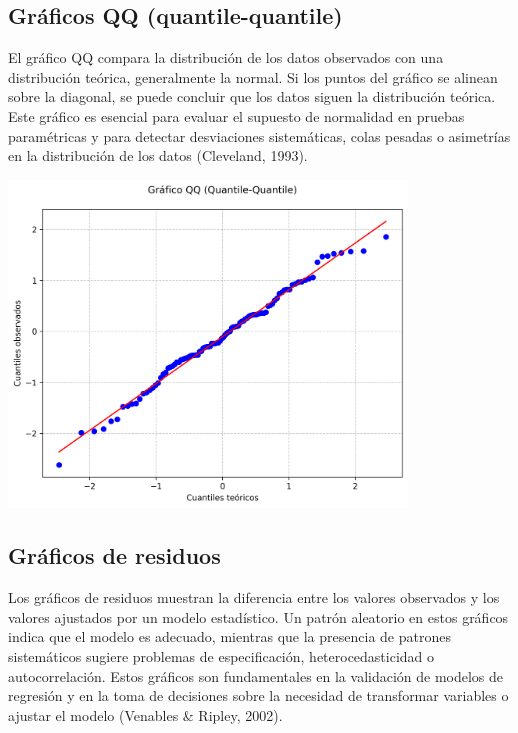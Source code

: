 \documentclass[
  spanish,
  a4paper,
  DIV=11,
  numbers=noendperiod,
  onepage,
  openany]{scrreprt}
\begin{document}
\subsection{Gráficos QQ
(quantile-quantile)}\label{gruxe1ficos-qq-quantile-quantile}

El gráfico QQ compara la distribución de los datos observados con una
distribución teórica, generalmente la normal. Si los puntos del gráfico
se alinean sobre la diagonal, se puede concluir que los datos siguen la
distribución teórica. Este gráfico es esencial para evaluar el supuesto
de normalidad en pruebas paramétricas y para detectar desviaciones
sistemáticas, colas pesadas o asimetrías en la distribución de los datos
(Cleveland, 1993).

\begin{center}
\includegraphics[width=4.16667in,height=\textheight,keepaspectratio]{images/qqplot.png}
\end{center}

\subsection{Gráficos de residuos}\label{gruxe1ficos-de-residuos}

Los gráficos de residuos muestran la diferencia entre los valores
observados y los valores ajustados por un modelo estadístico. Un patrón
aleatorio en estos gráficos indica que el modelo es adecuado, mientras
que la presencia de patrones sistemáticos sugiere problemas de
especificación, heterocedasticidad o autocorrelación. Estos gráficos son
fundamentales en la validación de modelos de regresión y en la toma de
decisiones sobre la necesidad de transformar variables o ajustar el
modelo (Venables \& Ripley, 2002).
\end{document}
